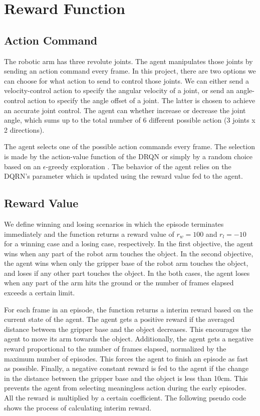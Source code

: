 \documentclass[a4paper]{article}
\begin{document}
\section{Reward Function}
\subsection{Action Command}
The robotic arm has three revolute joints. The agent manipulates those joints by sending an action command every frame. In this project, there are two options we can choose for what action to send to control those joints. We can either send a velocity-control action to specify the angular velocity of a joint, or send an angle-control action to specify the angle offset of a joint.  The latter is chosen to achieve an accurate joint control. The agent can whether increase or decrease the joint angle, which sums up to the total number of 6 different possible action (3 joints x 2 directions).

The agent selects one of the possible action commands every frame. The selection is made by the action-value function of the DRQN or simply by a random choice based on an \(\epsilon\)-greedy exploration \cite{Zhan2016}. The behavior of the agent relies on the DQRN's parameter which is updated using the reward value fed to the agent.

\subsection{Reward Value}
We define winning and losing scenarios in which the episode terminates immediately and the function returns a reward value of \(r_w=100\) and \(r_l=-10\) for a winning case and a losing case, respectively. In the first objective, the agent wins when any part of the robot arm touches the object. In the second objective, the agent wins when only the gripper base of the robot arm touches the object, and loses if any other part touches the object. In the both cases, the agent loses when any part of the arm hits the ground or the number of frames elapsed exceeds a certain limit.

For each frame in an episode, the function returns a interim reward based on the current state of the agent. The agent gets a positive reward if the averaged distance between the gripper base and the object decreases. This encourages the agent to move its arm towards the object. Additionally, the agent gets a negative reward proportional to the number of frames elapsed, normalized by the maximum number of episodes. This forces the agent to finish an episode as fast as possible. Finally, a negative constant reward is fed to the agent if the change in the distance between the gripper base and the object is less than 10cm. This prevents the agent from selecting meaningless action during the early episodes. All the reward is multiplied by a certain coefficient. The following pseudo code shows the process of calculating interim reward.
\end{document}

